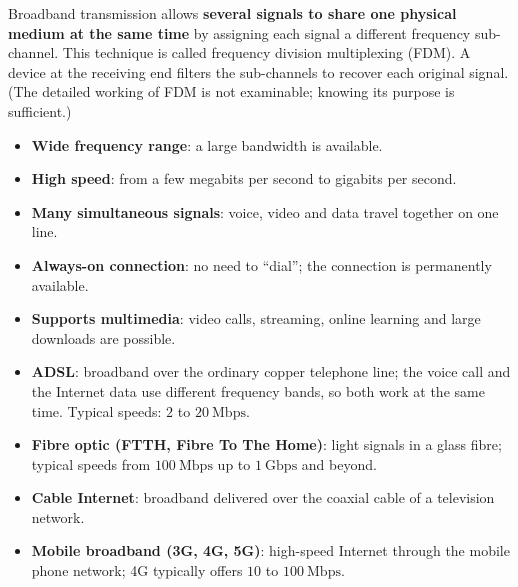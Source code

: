 \documentclass[11pt]{article}
\newcommand{\cle}[1]{{\popxbold\color{popdark}#1}}
\begin{document}
\begin{propriete}
Broadband transmission allows \textbf{several signals to share one physical medium at the same time} by assigning each signal a different frequency sub-channel. This technique is called \cle{frequency division multiplexing} (FDM). A device at the receiving end filters the sub-channels to recover each original signal. (The detailed working of FDM is not examinable; knowing its purpose is sufficient.)
\end{propriete}

\begin{aretenir}
\begin{itemize}
\item \textbf{Wide frequency range}: a large bandwidth is available.
\item \textbf{High speed}: from a few megabits per second to gigabits per second.
\item \textbf{Many simultaneous signals}: voice, video and data travel together on one line.
\item \textbf{Always-on connection}: no need to ``dial''; the connection is permanently available.
\item \textbf{Supports multimedia}: video calls, streaming, online learning and large downloads are possible.
\end{itemize}
\end{aretenir}

\begin{exemplebox}
\begin{itemize}
\item \textbf{ADSL}: broadband over the ordinary copper telephone line; the voice call and the Internet data use different frequency bands, so both work at the same time. Typical speeds: $2$ to $20\ \mathrm{Mbps}$.
\item \textbf{Fibre optic (FTTH, Fibre To The Home)}: light signals in a glass fibre; typical speeds from $100\ \mathrm{Mbps}$ up to $1\ \mathrm{Gbps}$ and beyond.
\item \textbf{Cable Internet}: broadband delivered over the coaxial cable of a television network.
\item \textbf{Mobile broadband (3G, 4G, 5G)}: high-speed Internet through the mobile phone network; 4G typically offers $10$ to $100\ \mathrm{Mbps}$.
\end{itemize}
\end{exemplebox}
\end{document}
